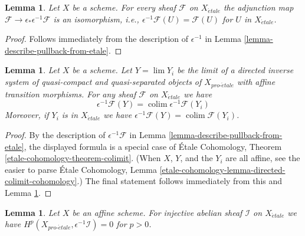 \documentclass{stacks-project}
\theoremstyle{plain}
\newtheorem{lemma}[subsection]{Lemma}
\theoremstyle{definition}
\theoremstyle{remark}
\numberwithin{equation}{subsection}
\def\lim{\mathop{\mathrm{lim}}\nolimits}
\def\colim{\mathop{\mathrm{colim}}\nolimits}
\def\proetale{{pro\text{-}\acute{e}tale}}
\def\etale{{\acute{e}tale}}
\begin{document}
\begin{lemma}
\label{lemma-fully-faithful}
Let $X$ be a scheme. For every sheaf $\mathcal{F}$ on $X_\etale$
the adjunction map $\mathcal{F} \to \epsilon_*\epsilon^{-1}\mathcal{F}$ is an
isomorphism, i.e., $\epsilon^{-1}\mathcal{F}(U) = \mathcal{F}(U)$
for $U$ in $X_\etale$.
\end{lemma}

\begin{proof}
Follows immediately from the description of
$\epsilon^{-1}$ in Lemma \ref{lemma-describe-pullback-from-etale}.
\end{proof}

\begin{lemma}
\label{lemma-limit-pullback}
Let $X$ be a scheme. Let $Y = \lim Y_i$ be the limit of a directed inverse
system of quasi-compact and quasi-separated objects of $X_\proetale$
with affine transition morphisms. For any sheaf $\mathcal{F}$ on $X_\etale$
we have
$$
\epsilon^{-1}\mathcal{F}(Y) = \colim \epsilon^{-1}\mathcal{F}(Y_i)
$$
Moreover, if $Y_i$ is in $X_\etale$ we have
$\epsilon^{-1}\mathcal{F}(Y) = \colim \mathcal{F}(Y_i)$.
\end{lemma}

\begin{proof}
By the description of $\epsilon^{-1}\mathcal{F}$ in
Lemma \ref{lemma-describe-pullback-from-etale}, the displayed formula
is a special case of \'Etale Cohomology, Theorem
\ref{etale-cohomology-theorem-colimit}.
(When $X$, $Y$, and the $Y_i$ are all affine, see
the easier to parse \'Etale Cohomology, Lemma
\ref{etale-cohomology-lemma-directed-colimit-cohomology}.)
The final statement follows immediately from this
and Lemma \ref{lemma-fully-faithful}.
\end{proof}

\begin{lemma}
\label{lemma-affine-vanishing}
Let $X$ be an affine scheme. For injective abelian sheaf $\mathcal{I}$ on
$X_\etale$ we have $H^p(X_\proetale, \epsilon^{-1}\mathcal{I}) = 0$
for $p > 0$.
\end{lemma}
\end{document}
